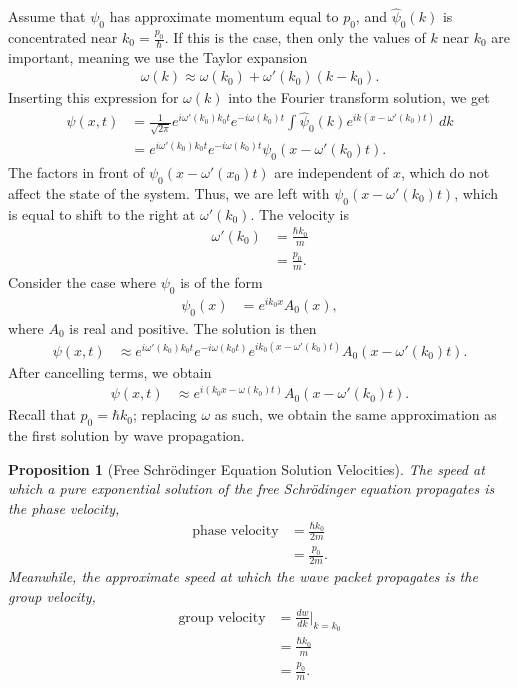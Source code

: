 \documentclass[12pt]{extarticle}
\theoremstyle{plain}
\newtheorem*{proposition}{Proposition}%
\theoremstyle{definition}
\theoremstyle{remark}
\begin{document}
    Assume that $\psi_0$ has approximate momentum equal to $p_0$, and $\hat{\psi}_0(k)$ is concentrated near $k_0 = \frac{p_0}{\hbar}$. If this is the case, then only the values of $k$ near $k_0$ are important, meaning we use the Taylor expansion
    \begin{align*}
      \omega(k) \approx \omega(k_0) + \omega'(k_0)(k - k_0).
    \end{align*}
    Inserting this expression for $\omega(k)$ into the Fourier transform solution, we get
    \begin{align*}
      \psi(x,t) &= \frac{1}{\sqrt{2\pi}} e^{i\omega'(k_0)k_0 t}e^{-i\omega(k_0)t}\int_{}^{} \hat{\psi}_0(k)e^{ik\left(x - \omega'(k_0)t\right)}\:dk\\
                &= e^{i\omega'(k_0)k_0t}e^{-i\omega(k_0)t}\psi_0(x - \omega'(k_0)t).
    \end{align*}
    The factors in front of $\psi_0(x-\omega'(x_0)t)$ are independent of $x$, which do not affect the state of the system. Thus, we are left with $\psi_0\left(x-\omega'(k_0)t\right)$, which is equal to shift to the right at $\omega'(k_0)$. The velocity is
    \begin{align*}
      \omega'(k_0) &= \frac{\hbar k_0}{m}\\
                   &= \frac{p_0}{m}.
    \end{align*}
    Consider the case where $\psi_0$ is of the form
    \begin{align*}
      \psi_0(x) &= e^{ik_0x}A_0(x),
    \end{align*}
    where $A_0$ is real and positive. The solution is then
    \begin{align*}
      \psi(x,t) &\approx e^{i\omega'(k_0)k_0t}e^{-i\omega(k_0 t)}e^{ik_0\left(x - \omega'(k_0)t\right)}A_0(x - \omega'(k_0)t).
    \end{align*}
    After cancelling terms, we obtain
    \begin{align*}
      \psi(x,t) &\approx e^{i\left(k_0 x - \omega(k_0)t\right)}A_0(x - \omega'(k_0)t).
    \end{align*}
    Recall that $p_0 = \hbar k_0$; replacing $\omega$ as such, we obtain the same approximation as the first solution by wave propagation.
    \begin{proposition}[Free Schrödinger Equation Solution Velocities]
    The speed at which a pure exponential solution of the free Schrödinger equation propagates is the phase velocity,
    \begin{align*}
      \text{phase velocity} &= \frac{\hbar k_0}{2m}\\
                            &= \frac{p_0}{2m}.
    \end{align*}
    Meanwhile, the approximate speed at which the wave packet propagates is the group velocity,
    \begin{align*}
      \text{group velocity} &= \frac{dw}{dk}\biggr\vert_{k=k_0}\\
                            &= \frac{\hbar k_0}{m}\\
                            &= \frac{p_0}{m}.
    \end{align*}
    \end{proposition}
\end{document}
